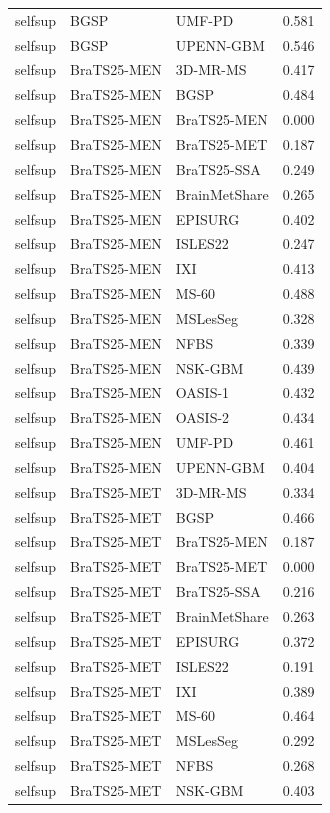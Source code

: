 \begin{tabular}{lllr}
selfsup & BGSP & UMF-PD & 0.581 \\
selfsup & BGSP & UPENN-GBM & 0.546 \\
selfsup & BraTS25-MEN & 3D-MR-MS & 0.417 \\
selfsup & BraTS25-MEN & BGSP & 0.484 \\
selfsup & BraTS25-MEN & BraTS25-MEN & 0.000 \\
selfsup & BraTS25-MEN & BraTS25-MET & 0.187 \\
selfsup & BraTS25-MEN & BraTS25-SSA & 0.249 \\
selfsup & BraTS25-MEN & BrainMetShare & 0.265 \\
selfsup & BraTS25-MEN & EPISURG & 0.402 \\
selfsup & BraTS25-MEN & ISLES22 & 0.247 \\
selfsup & BraTS25-MEN & IXI & 0.413 \\
selfsup & BraTS25-MEN & MS-60 & 0.488 \\
selfsup & BraTS25-MEN & MSLesSeg & 0.328 \\
selfsup & BraTS25-MEN & NFBS & 0.339 \\
selfsup & BraTS25-MEN & NSK-GBM & 0.439 \\
selfsup & BraTS25-MEN & OASIS-1 & 0.432 \\
selfsup & BraTS25-MEN & OASIS-2 & 0.434 \\
selfsup & BraTS25-MEN & UMF-PD & 0.461 \\
selfsup & BraTS25-MEN & UPENN-GBM & 0.404 \\
selfsup & BraTS25-MET & 3D-MR-MS & 0.334 \\
selfsup & BraTS25-MET & BGSP & 0.466 \\
selfsup & BraTS25-MET & BraTS25-MEN & 0.187 \\
selfsup & BraTS25-MET & BraTS25-MET & 0.000 \\
selfsup & BraTS25-MET & BraTS25-SSA & 0.216 \\
selfsup & BraTS25-MET & BrainMetShare & 0.263 \\
selfsup & BraTS25-MET & EPISURG & 0.372 \\
selfsup & BraTS25-MET & ISLES22 & 0.191 \\
selfsup & BraTS25-MET & IXI & 0.389 \\
selfsup & BraTS25-MET & MS-60 & 0.464 \\
selfsup & BraTS25-MET & MSLesSeg & 0.292 \\
selfsup & BraTS25-MET & NFBS & 0.268 \\
selfsup & BraTS25-MET & NSK-GBM & 0.403 \\

\end{tabular}
